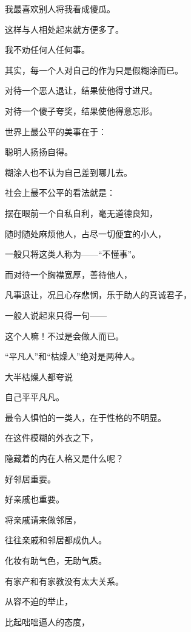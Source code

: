 \par 我最喜欢别人将我看成傻瓜。
\par 这样与人相处起来就方便多了。
\par 
\par 我不劝任何人任何事。
\par 其实，每一个人对自己的作为只是假糊涂而已。
\par 
\par 对待一个恶人退让，结果使他得寸进尺。
\par 对待一个傻子夸奖，结果使他得意忘形。
\par 
\par 世界上最公平的美事在于：
\par 聪明人扬扬自得。
\par 糊涂人也不认为自己差到哪儿去。
\par 
\par 社会上最不公平的看法就是：
\par 摆在眼前一个自私自利，毫无道德良知，
\par 随时随处麻烦他人，占尽一切便宜的小人，
\par 一般只将这类人称为——“不懂事”。
\par 而对待一个胸襟宽厚，善待他人，
\par 凡事退让，况且心存悲悯，乐于助人的真诚君子，
\par 一般人说起来只得一句——
\par 这个人嘛！不过是会做人而已。
\par 
\par “平凡人”和“枯燥人”绝对是两种人。
\par 大半枯燥人都夸说
\par 自己平平凡凡。
\par 
\par 最令人惧怕的一类人，在于性格的不明显。
\par 在这件模糊的外衣之下，
\par 隐藏着的内在人格又是什么呢？
\par 
\par 好邻居重要。
\par 好亲戚也重要。
\par 将亲戚请来做邻居，
\par 往往亲戚和邻居都成仇人。
\par 
\par 化妆有助气色，无助气质。
\par 有家产和有家教没有太大关系。
\par 
\par 从容不迫的举止，
\par 比起咄咄逼人的态度，
